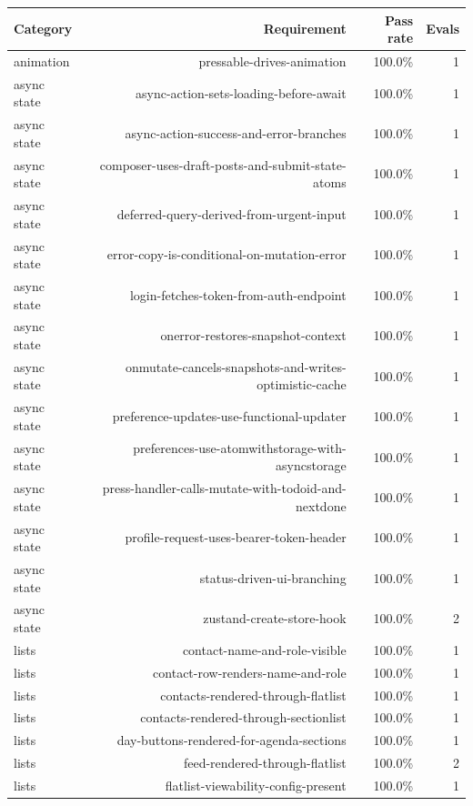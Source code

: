 \begin{table}[htbp]
\centering
\begin{tabular}{lrrr}
\toprule
Category & Requirement & Pass rate & Evals \\
\midrule
animation & pressable-drives-animation & 100.0\% & 1 \\
async state & async-action-sets-loading-before-await & 100.0\% & 1 \\
async state & async-action-success-and-error-branches & 100.0\% & 1 \\
async state & composer-uses-draft-posts-and-submit-state-atoms & 100.0\% & 1 \\
async state & deferred-query-derived-from-urgent-input & 100.0\% & 1 \\
async state & error-copy-is-conditional-on-mutation-error & 100.0\% & 1 \\
async state & login-fetches-token-from-auth-endpoint & 100.0\% & 1 \\
async state & onerror-restores-snapshot-context & 100.0\% & 1 \\
async state & onmutate-cancels-snapshots-and-writes-optimistic-cache & 100.0\% & 1 \\
async state & preference-updates-use-functional-updater & 100.0\% & 1 \\
async state & preferences-use-atomwithstorage-with-asyncstorage & 100.0\% & 1 \\
async state & press-handler-calls-mutate-with-todoid-and-nextdone & 100.0\% & 1 \\
async state & profile-request-uses-bearer-token-header & 100.0\% & 1 \\
async state & status-driven-ui-branching & 100.0\% & 1 \\
async state & zustand-create-store-hook & 100.0\% & 2 \\
lists & contact-name-and-role-visible & 100.0\% & 1 \\
lists & contact-row-renders-name-and-role & 100.0\% & 1 \\
lists & contacts-rendered-through-flatlist & 100.0\% & 1 \\
lists & contacts-rendered-through-sectionlist & 100.0\% & 1 \\
lists & day-buttons-rendered-for-agenda-sections & 100.0\% & 1 \\
lists & feed-rendered-through-flatlist & 100.0\% & 2 \\
lists & flatlist-viewability-config-present & 100.0\% & 1 \\

\end{tabular}
\end{table}
